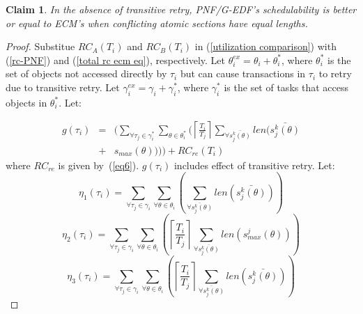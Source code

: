 \documentclass[a4paper,english]{article}
\newtheorem{clm}{Claim}
\newtheorem{proof}{Proof}
\begin{document}
\begin{clm}\label{PNF ecf comaprison clm}
In the absence of transitive retry, PNF/G-EDF's schedulability is better or equal to ECM's when conflicting atomic sections have equal lengths.
\end{clm}
\begin{proof}\normalfont
Substitue $RC_{A}(T_{i})$ and $RC_{B}(T_{i})$ in (\ref{utilization comparison})
with (\ref{rc-PNF}) and (\ref{total rc ecm eq}), respectively. Let $\theta_{i}^{ex}=\theta_{i}+\theta_{i}^{*}$, where $\theta_{i}^{*}$
is the set of objects not accessed directly by $\tau_{i}$ but can
cause transactions in $\tau_{i}$ to retry due to transitive retry.
Let $\gamma_{i}^{ex}=\gamma_{i}+\gamma_{i}^{*}$, where $\gamma_{i}^{*}$
is the set of tasks that access objects in $\theta_{i}^{*}$.
Let:
%

\begin{eqnarray*}
g(\tau_{i}) & = & \Bigg(\sum_{\forall\tau_{j}\in\gamma_{i}^{*}}\sum_{\theta\in\theta_{i}^{*}}\Bigg(\left\lceil \frac{T_{i}}{T_{j}}\right\rceil \sum_{\forall\bar{s_{j}^{k}(\theta)}}len\Big(\bar{s_{j}^{k}(\theta)}\\
 & + & s_{max}(\theta)\Big)\Bigg)\Bigg)+RC_{re}(T_{i})
\end{eqnarray*}
%
where $RC_{re}$ is given by~(\ref{eq6}). $g(\tau_i)$ includes effect of transitive retry. Let:
%
\begin{equation*}
\eta_{1}(\tau_{i})=\sum_{\forall\tau_{j}\in\gamma_{i}}\sum_{\forall\theta\in\theta_{i}}\left(\sum_{\bar{\forall s_{j}^{k}(\theta)}}len\left(\bar{s_{j}^{k}(\theta)}\right)\right)
\end{equation*}
%
\begin{equation*}
\eta_{2}(\tau_{i})=\sum_{\forall\tau_{j}\in\gamma_{i}}\sum_{\forall\theta\in\theta_{i}}\left(\left\lceil \frac{T_{i}}{T_{j}}\right\rceil \sum_{\forall\bar{s_{j}^{k}(\theta)}}len\left(s_{max}^{j}(\theta)\right)\right)
\end{equation*}
%
%
\begin{equation*}
\eta_{3}(\tau_{i})=\sum_{\forall\tau_{j}\in\gamma_{i}}\sum_{\forall\theta\in\theta_{i}}\left(\left\lceil \frac{T_{i}}{T_{j}}\right\rceil \sum_{\bar{\forall s_{j}^{k}(\theta)}}len\left(\bar{s_{j}^{k}(\theta)}\right)\right)

\end{equation*}
\end{proof}
\end{document}
